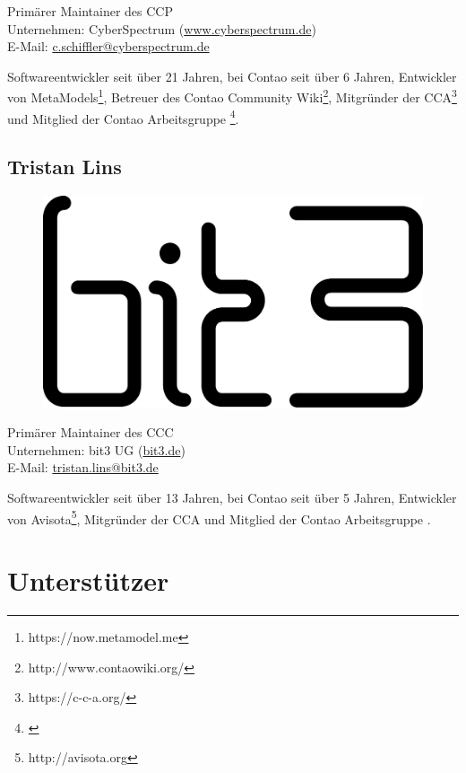 \documentclass[
paper=a4,
draft=false,%
fontsize=10pt%
]{scrartcl}
\begin{document}
Primärer Maintainer des CCP \\
Unternehmen: CyberSpectrum (\href{https://www.cyberspectrum.de}{www.cyberspectrum.de}) \\
E-Mail: \href{mailto:c.schiffler@cyberspectrum.de}{c.schiffler@cyberspectrum.de}

Softwareentwickler seit über 21 Jahren, bei Contao seit über 6 Jahren, Entwickler von MetaModels\footnote{https://now.metamodel.me}, Betreuer des Contao Community Wiki\footnote{http://www.contaowiki.org/}, Mitgründer der CCA\footnote{https://c-c-a.org/\label{fn:cca}} und Mitglied der Contao Arbeitsgruppe \footnote{\label{fn:contao-workgroup-core}}.

\subsection*{Tristan  Lins}

\begin{figure}
  \vspace{-40pt}
  \hfill
  \includegraphics[width=.2\textwidth]{bilder/bit3}
\end{figure}

Primärer Maintainer des CCC \\
Unternehmen: bit3 UG (\href{https://bit3.de}{bit3.de}) \\
E-Mail: \href{mailto:tristan.lins@bit3.de}{tristan.lins@bit3.de}

Softwareentwickler seit über 13 Jahren, bei Contao seit über 5 Jahren, Entwickler von Avisota\footnote{http://avisota.org}, Mitgründer der CCA und Mitglied der Contao Arbeitsgruppe .

\newpage

%
%

\section{Unterstützer}
\label{sec:backers}
\end{document}

